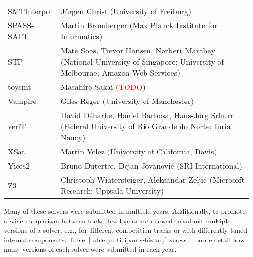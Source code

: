 \documentclass[twoside,11pt]{article}
\newcommand{\TODO}[0]{\textcolor{red}{TODO}}
\begin{document}
\begin{table}
\begin{tabular}{|l|p{13cm}|}
    SMTInterpol       & J\"urgen Christ
                        (University of Freiburg)\\
    SPASS-SATT        & Martin Bromberger
                        (Max Planck Institute for Informatics)\\
    STP               & Mate Soos, Trevor Hansen, Norbert Manthey
                        (National University of Singapore; University of Melbourne; Amazon Web Services)\\
    toysmt            & Masahiro Sakai
                        (\TODO)\\
    Vampire           & Giles Reger
                        (University of Manchester)\\
    veriT             & David D\'eharbe, Haniel Barbosa, Hans-J\"org Schurr
                        (Federal University of Rio Grande do Norte; Inria Nancy)\\
    XSat              & Martin Velez
                        (University of California, Davis)\\
    Yices2            & Bruno Dutertre, Dejan Jovanovi\'c
                        (SRI International)\\
    Z3                & Christoph Wintersteiger, Aleksandar Zelji\'c
                        (Microsoft Research; Uppsala University)\\
    \hline
  \end{tabular}  
\end{table}

Many of these solvers were submitted in multiple years.  Additionally,
to promote a wide comparison between tools, developers are allowed to
submit multiple versions of a solver, e.g., for different competition
tracks or with differently tuned internal components.
Table~\ref{table:participants-history} shows in more detail how many
versions of each solver were submitted in each year.
\end{document}
